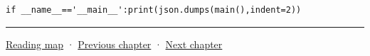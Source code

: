 \begin{verbatim}
if __name__=='__main__':print(json.dumps(main(),indent=2))
\end{verbatim}

\begin{center}\rule{0.5\linewidth}{0.5pt}\end{center}

\hyperref[volume-reading-map]{Reading map} · \hyperref[04-visual-computing-ii-ch033]{Previous chapter} · \hyperref[04-visual-computing-ii-ch035]{Next chapter}

